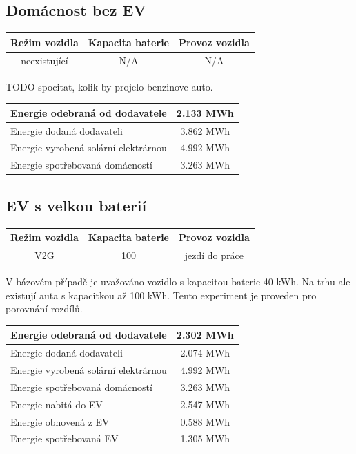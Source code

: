 \documentclass[12pt,a4paper]{Cotmas-2018}
\begin{document}
\subsection{Domácnost bez EV}

\bigskip
\begin{tabular}{ | c | c | c | }
\hline
Režim vozidla & Kapacita baterie & Provoz vozidla \\
\hline
neexistující & N/A & N/A \\
\hline
\end{tabular}
\bigskip

TODO spocitat, kolik by projelo benzinove auto.

\bigskip
\begin{tabular}{ | l | c | }
\hline
Energie odebraná od dodavatele & 2.133 MWh \\
\hline
Energie dodaná dodavateli &  3.862 MWh \\
\hline
Energie vyrobená solární elektrárnou & 4.992 MWh \\
\hline
Energie spotřebovaná domácností & 3.263 MWh \\
\hline
\end{tabular}
\bigskip


\subsection{EV s velkou baterií}

\bigskip
\begin{tabular}{ | c | c | c | }
\hline
Režim vozidla & Kapacita baterie & Provoz vozidla \\
\hline
V2G & 100 & jezdí do práce \\
\hline
\end{tabular}
\bigskip

V bázovém případě je uvažováno vozidlo s kapacitou baterie 40 kWh.
Na trhu ale existují auta s kapacitkou až 100 kWh.
Tento experiment je proveden pro porovnání rozdílů.

\bigskip
\begin{tabular}{ | l | c | }
\hline
Energie odebraná od dodavatele & 2.302 MWh \\
\hline
Energie dodaná dodavateli & 2.074 MWh \\
\hline
Energie vyrobená solární elektrárnou & 4.992 MWh \\
\hline
Energie spotřebovaná domácností & 3.263 MWh \\
\hline
Energie nabitá do EV & 2.547 MWh \\
\hline
Energie obnovená z EV & 0.588 MWh \\
\hline
Energie spotřebovaná EV & 1.305 MWh \\
\hline
\end{tabular}
\bigskip
\end{document}
